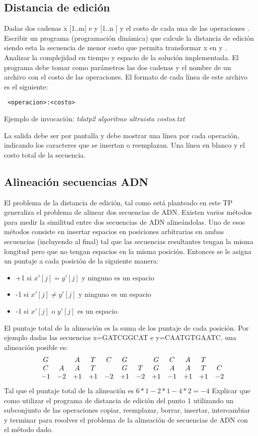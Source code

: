 \documentclass[12pt]{article}
\begin{document}
\newpage
\subsection{Distancia de edición}
Dadas dos cadenas x [1..m] e y [1..n ] y el costo de cada una de las operaciones
. Escribir un programa (programación dinámica) que calcule la distancia de edición
siendo esta la secuencia de menor costo que permita transformar x en y .
Analizar la complejidad en tiempo y espacio de la solución implementada.
El programa debe tomar como parámetros las dos cadenas y el nombre de un
archivo con el costo de las operaciones. El formato de cada línea de este archivo
es el siguiente:

\verb# <operacion>:<costo>#

Ejemplo de invocación: \emph{tdatp2 algoritmo altruista costos.txt}

La salida debe ser por pantalla y debe mostrar una línea por cada operación,
indicando los caracteres que se insertan o reemplazan. Una línea en blanco y el costo total de
la secuencia.

\subsection{Alineación secuencias ADN}
El problema de la distancia de edición, tal como está planteado en este TP generaliza el
problema de alinear dos secuencias de ADN. Existen varios métodos para medir la
similitud entre dos secuencias de ADN alineándolas. Uno de esos métodos consiste en
insertar espacios en posiciones arbitrarias en ambas secuencias (incluyendo al final) tal
que las secuencias resultantes tengan la misma longitud pero que no tengan espacios en
la misma posición. Entonces se le asigna un puntaje a cada posición de la siguiente
manera:

\begin{itemize}
	\item +1 si $x'[j]=y'[j]$ y ninguno es un espacio
	\item -1 si $x'[j]\neq y'[j]$ y ninguno es un espacio
	\item -1 si $x'[j]$ o $y'[j]$ es un espacio
\end{itemize}

El puntaje total de la alineación es la suma de los puntaje de cada posición. Por ejemplo
dadas las secuencias x=GATCGGCAT e y=CAATGTGAATC, una alineación posible
es:
\[
\begin{array}{ccccccccccccc}
  &G &\space &A &T &C &G &\space &G &C &A &T &\space  \\
  &C &A &A &T &\space &G &T &G &A &A &T &C	\\
  &-1 &-2 &+1 &+1 &-2 &+1 &-2 &+1 &-1 &+1 &+1 &-2
\end{array}
\]
Tal que el puntaje total de la alineación es $6*1-2*1-4*2=-4$
Explicar que como utilizar el programa de distancia de edición del punto 1
utilizando un subconjunto de las operaciones copiar, reemplazar, borrar, insertar,
intercambiar y terminar para resolver el problema de la alineación de secuencias de
ADN con el método dado.
\end{document}
